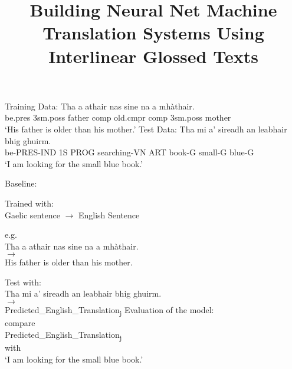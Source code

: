 \documentclass[a4paper]{article}
\title{Building Neural Net Machine Translation Systems Using Interlinear Glossed Texts}
\date{}
\begin{document}
\maketitle


\begin{exe}
\ex 
\begin{xlist}  
\ex Training Data:
	\gll    Tha a athair nas sine na a mh\`athair.\\  
            be.pres 3sm.poss father comp old.cmpr comp 3sm.poss mother
\\  
    \glt    `His father is older than his mother.' 
\ex Test Data:
\gll Tha mi a' sireadh an leabhair bhig ghuirm.\\
be-PRES-IND 1S PROG searching-VN ART book-G small-G blue-G\\
\glt `I am looking for the small blue book.' 
\end{xlist}
\end{exe}



\begin{exe}  
\ex Baseline: 
\begin{xlist}
	\ex Trained with:\\
	 Gaelic sentence $\rightarrow$ English Sentence 
	\begin{xlist}
		\ex e.g. \\
			Tha a athair nas sine na a mh\`athair. \\
			$\rightarrow$ \\
			His father is older than his mother.
	\end{xlist}
	\ex Test with:\\
		Tha mi a' sireadh an leabhair bhig ghuirm.\\
		$\rightarrow$ \\
		Predicted\_English\_Translation\textsubscript{j}
	\ex Evaluation of the model:\\
		compare\\ Predicted\_English\_Translation\textsubscript{j}\\ with\\
		`I am looking for the small blue book.'  
\end{xlist}
\end{exe}
\end{document}
